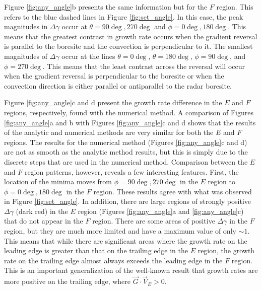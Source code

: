 Figure \ref{fig:any_angle}b presents the same information but for the \(F\) region. This refers to the blue dashed lines in Figure \ref{fig:set_angle}.  In this case, the peak magnitudes in \(\Delta\gamma\) occur at \(\theta=90\deg,270\deg\) and \(\phi=0\deg,180\deg\).  This means that the greatest contrast in growth rate occurs when the gradient reversal is parallel to the boresite and the convection is perpendicular to it.  The smallest magnitudes of \(\Delta\gamma\) occur at the lines \(\theta=0\deg\), \(\theta=180\deg\), \(\phi=90\deg\), and \(\phi=270\deg\). This means that the least contrast across the reversal will occur when the gradient reversal is perpendicular to the boresite or when the convection direction is either parallel or antiparallel to the radar boresite.



Figure \ref{fig:any_angle}c and d present the growth rate difference in the \(E\) and \(F\) regions, respectively, found with the numerical method.  A comparison of Figures \ref{fig:any_angle}a and b with Figures \ref{fig:any_angle}c and d shows that the results of the analytic and numerical methods are very similar for both the \(E\) and \(F\) regions. The results for the numerical method (Figures \ref{fig:any_angle}c and d) are not as smooth as the analytic method results, but this is simply due to the discrete steps that are used in the numerical method. Comparison between the \(E\) and \(F\) region patterns, however, reveals a few interesting features. First, the location of the minima moves from \(\phi=90\deg,270\deg\) in the \(E\) region to \(\phi=0\deg,180\deg\) in the \(F\) region.  These results agree with what was observed in Figure \ref{fig:set_angle}.  In addition, there are large regions of strongly positive \(\Delta\gamma\) (dark red) in the \(E\) region (Figures \ref{fig:any_angle}a and \ref{fig:any_angle}c) that do not appear in the \(F\) region.  There are some areas of positive \(\Delta\gamma\) in the \(F\) region, but they are much more limited and have a maximum value of only \(\sim 1\).  This means that while there are significant areas where the growth rate on the leading edge is greater than that on the trailing edge in the \(E\) region, the growth rate on the trailing edge almost always exceeds the leading edge in the \(F\) region. This is an important generalization of the well-known result that growth rates are more positive on the trailing edge, where \(\vec{G}\cdot \vec{V}_E>0\).



